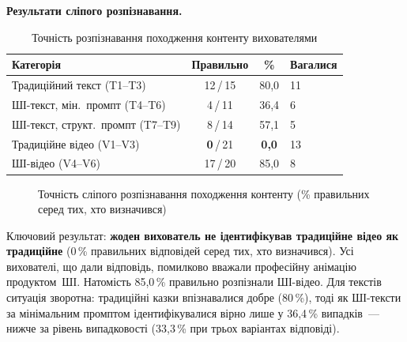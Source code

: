 \documentclass[14pt, a4paper]{extreport}
\begin{document}
\textbf{Результати сліпого розпізнавання.}

\begin{table}[htbp]
\caption{Точність розпізнавання походження контенту вихователями}
\centering
\begin{tabular}{|l|c|c|l|}
\hline
\rowcolor{tblhead}\textbf{Категорія} & \textbf{Правильно} & \textbf{\%} & \textbf{Вагалися} \\
\hline
Традиційний текст (T1--T3) & 12\,/\,15 & 80{,}0 & 11 \\
ШІ-текст, мін.~промпт (T4--T6) & 4\,/\,11  & 36{,}4 & 6 \\
ШІ-текст, структ.~промпт (T7--T9) & 8\,/\,14  & 57{,}1 & 5 \\
\hline
Традиційне відео (V1--V3) & \textbf{0}\,/\,21 & \textbf{0{,}0} & 13 \\
ШІ-відео (V4--V6) & 17\,/\,20 & 85{,}0 & 8 \\
\hline
\end{tabular}
\end{table}

\begin{figure}[htbp]
\centering
{}
\caption{Точність сліпого розпізнавання походження контенту (\% правильних серед тих, хто визначився)}
\end{figure}

Ключовий результат: \textbf{жоден вихователь не ідентифікував традиційне відео як традиційне} (0\,\% правильних відповідей серед тих, хто визначився). Усі вихователі, що дали відповідь, помилково вважали професійну анімацію продуктом~ШІ. Натомість 85{,}0\,\% правильно розпізнали ШІ-відео. Для текстів ситуація зворотна: традиційні казки впізнавалися добре (80\,\%), тоді як ШІ-тексти за мінімальним промптом ідентифікувалися вірно лише у 36{,}4\,\% випадків~--- нижче за рівень випадковості (33{,}3\,\% при трьох варіантах відповіді).
\end{document}
